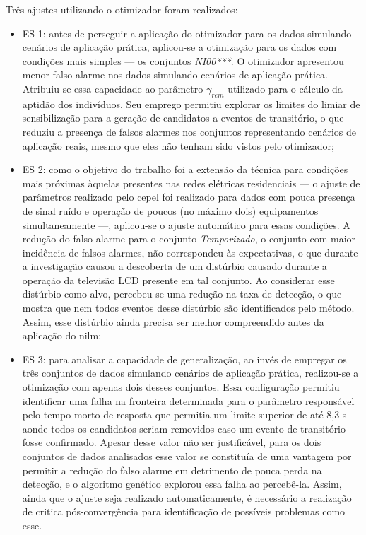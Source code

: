 Três ajustes utilizando o otimizador foram realizados:

\begin{itemize}
\item ES 1: antes de perseguir a aplicação do otimizador para os dados
simulando cenários de aplicação prática, aplicou-se a otimização para
os dados com condições mais simples --- os conjuntos \emph{NI00***}.
O otimizador apresentou menor falso alarme nos dados simulando
cenários de aplicação prática. Atribuiu-se essa capacidade ao
parâmetro $\gamma_{rem}$ utilizado para o cálculo da aptidão dos
indivíduos. Seu emprego permitiu explorar os limites do limiar de
sensibilização para a geração de candidatos a eventos de transitório,
o que reduziu a presença de falsos alarmes nos conjuntos representando
cenários de aplicação reais, mesmo que eles não tenham sido vistos
pelo otimizador;
\item ES 2: como o objetivo do trabalho foi a extensão da técnica para
condições mais próximas àquelas presentes nas redes elétricas
residenciais --- o ajuste de parâmetros realizado pelo \acs{cepel} foi
realizado para dados com pouca presença de sinal ruído e operação de
poucos (no máximo dois) equipamentos simultaneamente ---, aplicou-se o
ajuste automático para essas condições. A redução do falso alarme para
o conjunto \emph{Temporizado}, o conjunto com maior incidência de
falsos alarmes, não correspondeu às expectativas, o que durante a
investigação causou a descoberta de um distúrbio causado durante a
operação da televisão LCD presente em tal conjunto. Ao considerar esse
distúrbio como alvo, percebeu-se uma redução na taxa de detecção, o
que mostra que nem todos eventos desse distúrbio são identificados
pelo método. Assim, esse distúrbio ainda precisa ser melhor
compreendido antes da aplicação do \acs{nilm};
\item ES 3: para analisar a capacidade de generalização, ao invés de
empregar os três conjuntos de dados simulando cenários de aplicação
prática, realizou-se a otimização com apenas dois desses conjuntos.
Essa configuração permitiu identificar uma falha na fronteira
determinada para o parâmetro responsável pelo tempo morto de resposta
que permitia um limite superior de até 8,3 s aonde todos os candidatos
seriam removidos caso um evento de transitório fosse confirmado.
Apesar desse valor não ser justificável, para os dois conjuntos de
dados analisados esse valor se constituía de uma vantagem por permitir
a redução do falso alarme em detrimento de pouca perda na detecção, e
o algoritmo genético explorou essa falha ao percebê-la. Assim, ainda
que o ajuste seja realizado automaticamente, é necessário a realização
de critica pós-convergência para identificação de possíveis problemas
como esse.
\end{itemize}

